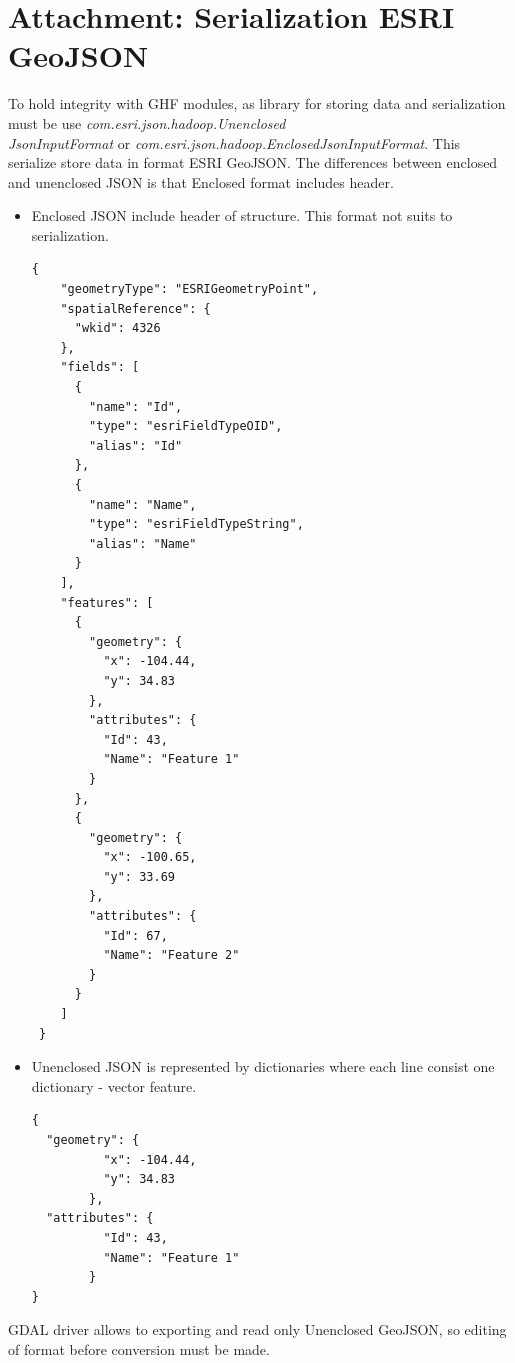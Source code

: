 \documentclass[a4paper,12pt,oneside]{report}
\begin{document}
\section{Attachment: Serialization ESRI GeoJSON}\label{serde}
		To hold integrity with GHF modules, as library for storing data and
	serialization must be use
	\textit{com.esri.json.hadoop.Unenclosed\\JsonInputFormat} or
	\textit{com.esri.json.hadoop.EnclosedJsonInputFormat}. This serialize store data
	in format ESRI GeoJSON. The differences between enclosed and unenclosed JSON is that 
	Enclosed format includes header.\cite{ESRI_serde}
	\begin{itemize}
	\item Enclosed JSON include header of structure. This format not suits to
	serialization.
		\begin{footnotesize}
			\begin{lstlisting}[style=python]
{
    "geometryType": "ESRIGeometryPoint",
    "spatialReference": {
      "wkid": 4326
    },
    "fields": [
      {
        "name": "Id",
        "type": "esriFieldTypeOID",
        "alias": "Id"
      },
      {
        "name": "Name",
        "type": "esriFieldTypeString",
        "alias": "Name"
      }
    ],
    "features": [
      {
        "geometry": {
          "x": -104.44,
          "y": 34.83
        },
        "attributes": {
          "Id": 43,
          "Name": "Feature 1"
        }
      },
      {
        "geometry": {
          "x": -100.65,
          "y": 33.69
        },
        "attributes": {
          "Id": 67,
          "Name": "Feature 2"
        }
      }
    ]
 }
			\end{lstlisting}
		\end{footnotesize}
	\item Unenclosed JSON is represented by dictionaries where each line consist one
	dictionary - vector feature.
		\begin{footnotesize}
			\begin{lstlisting}[style=python]
{
  "geometry": {
          "x": -104.44,
          "y": 34.83
        },
  "attributes": {
          "Id": 43,
          "Name": "Feature 1"
        }
}
			\end{lstlisting}
		\end{footnotesize}
	
	\end{itemize}
	GDAL driver allows to exporting and read only Unenclosed GeoJSON, so editing of format
	before conversion must be made.
\end{document}
